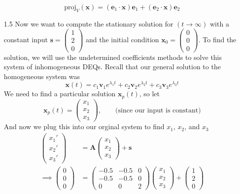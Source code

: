 \documentclass[12pt]{article}
\begin{document}
\begin{enumerate}
\[
    \text{proj}_{V}(\mathbf{x}) = \left(\mathbf{e}_{1} \cdot \mathbf{x}\right)\mathbf{e}_{1} + \left(\mathbf{e}_{2} \cdot \mathbf{x}\right)\mathbf{e}_{2}
\]
\item[1.5] Now we want to compute the stationary solution for $(t \rightarrow \infty)$ with a constant input $\mathbf{s}=\begin{pmatrix}1\\ 2\\ 0\end{pmatrix}$ and the initial condition $\mathbf{x}_{0}=\begin{pmatrix}0\\ 0\\ 0\end{pmatrix}$.
To find the solution, we will use the undetermined coefficients methods to solve this system of inhomogeneous DEQs. Recall that our general solution to the homogeneous system was
\[
    \mathbf{x}(t)=c_{1}\mathbf{v}_{1}e^{\lambda_{1}t} + c_{2}\mathbf{v}_{2}e^{\lambda_{2}t} + c_{3}\mathbf{v}_{3}e^{\lambda_{3}t}
\]
We need to find a particular solution $\mathbf{x}_{p}(t)$, so let
\[
\mathbf{x}_{p}(t)=\begin{pmatrix}x_{1}\\ x_{2}\\ x_{3}\end{pmatrix}, \qquad \text{(since our input is constant)}
\]
And now we plug this into our orginal system to find $x_{1}$, $x_{2}$, and $x_{3}$
\begin{align*}
    \begin{pmatrix}x_{1}'\\ x_{2}'\\ x_{3}'\end{pmatrix} &= \mathbf{A}\begin{pmatrix}x_{1}\\ x_{2}\\ x_{3}\end{pmatrix} + \mathbf{s}\\
    \implies \begin{pmatrix}0\\ 0\\ 0\end{pmatrix} &= \begin{pmatrix}-0.5 & -0.5 & 0\\ -0.5 & -0.5 & 0\\0 & 0 & 2\end{pmatrix}\begin{pmatrix}x_{1}\\ x_{2}\\ x_{3}\end{pmatrix} + \begin{pmatrix}1\\ 2\\ 0\end{pmatrix}\\

\end{align*}
\end{enumerate}
\end{document}
